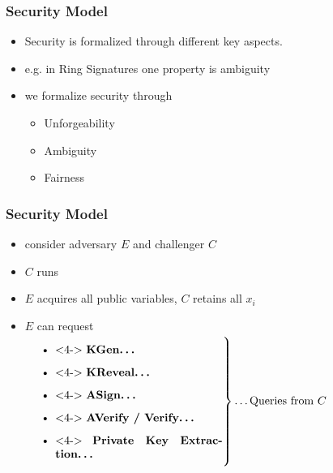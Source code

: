 \begin{frame}
	\frametitle{Security Model}

	\begin{itemize}[<+->]
		\setlength\itemsep{1em}
		\item Security is formalized through different key aspects.
		\item e.g. in Ring Signatures one property is ambiguity
		\item we formalize security through
			\begin{itemize}
				\item Unforgeability
				\item Ambiguity
				\item Fairness
			\end{itemize}
	\end{itemize}
\end{frame}

\begin{frame}
	\frametitle{Security Model}

	\begin{itemize}[<+->]
		\setlength\itemsep{1em}
		\item consider adversary $E$ and challenger $C$
		\item $C$ runs \setup
		\item $E$ acquires all public variables, $C$ retains all $x_i$
		\item $E$ can request\\[.2cm]
			$\left.\parbox{.5\textwidth}{%
			\begin{itemize}
				\item<4-> \textbf{KGen\ldots}
				\item<4-> \textbf{KReveal\ldots}
				\item<4-> \textbf{ASign\ldots} 
				\item<4-> \textbf{AVerify / Verify\ldots}
				\item<4-> \textbf{Private Key Extraction\ldots}
			\end{itemize}%
			}\right\}\text{\ldots Queries from } C$
		\end{itemize}
\end{frame}